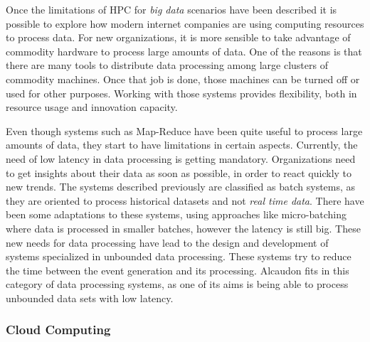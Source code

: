 Once the limitations of HPC for \textit{big data} scenarios have been described
it is possible to explore how modern internet companies are using computing
resources to process data. For new organizations, it is more sensible to take
advantage of commodity hardware to process large amounts of data. One of the
reasons is that there are many tools to distribute data processing among large
clusters of commodity machines. Once that job is done, those machines can be
turned off or used for other purposes. Working with those systems provides
flexibility, both in resource usage and innovation capacity. 

Even though systems such as Map-Reduce have been quite useful to process large
amounts of data, they start to have limitations in certain aspects. Currently,
the need of low latency in data processing is getting mandatory. Organizations
need to get insights about their data as soon as possible, in order to react
quickly to new trends. The systems described previously are classified as batch
systems, as they are oriented to process historical datasets and not
\textit{real time data}. There have been some adaptations to these systems, using
approaches like micro-batching where data is processed in smaller batches,
however the latency is still big. These new needs for data processing have lead
to the design and development of systems specialized in unbounded data
processing. These systems try to reduce the time between the event generation
and its processing. Alcaudon fits in this category of data processing systems,
as one of its aims is being able to process unbounded data sets with low
latency.

\subsubsection{Cloud Computing}

